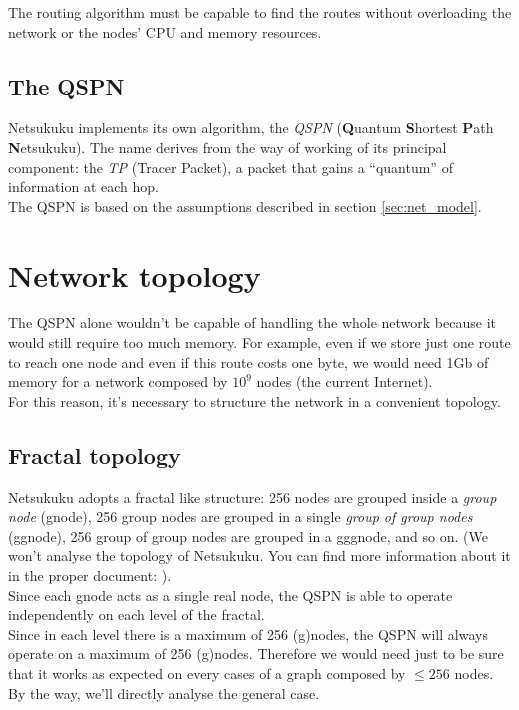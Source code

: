 \documentclass[a4paper]{article}
\begin{document}
The routing algorithm must be capable to find the routes without overloading
the network or the nodes' CPU and memory resources.

\subsection{The QSPN}

Netsukuku implements its own algorithm, the \emph{QSPN} (\textbf{Q}uantum
\textbf{S}hortest \textbf{P}ath \textbf{N}etsukuku). The name derives from the
way of working of its principal component: the \emph{TP} (Tracer Packet), a
packet that gains a ``quantum'' of information at each hop.\\

The QSPN is based on the assumptions described in section \ref{sec:net_model}.

\section{Network topology}
\label{sec:net_topology}

The QSPN alone wouldn't be capable of handling the whole network because it
would still require too much memory. For example, even if we store just one
route to reach one node and even if this route costs one byte, we would need
1Gb of memory for a network composed by $10^9$ nodes (the current Internet).\\

For this reason, it's necessary to structure the network in a convenient
topology.

\subsection{Fractal topology}
\label{sec:fractal_topology}
Netsukuku adopts a fractal like structure:
256 nodes are grouped inside a \emph{group node} (gnode), 256 group nodes are grouped
in a single \emph{group of group nodes} (ggnode), 256 group of group nodes are
grouped in a gggnode, and so on. (We won't analyse the topology of Netsukuku. You 
can find more information about it in the proper document: \cite{ntktopology}).\\

Since each gnode acts as a single real node, the QSPN is able to operate independently
on each level of the fractal.\\

Since in each level there is a maximum of 256 (g)nodes, the QSPN will
always operate on a maximum of 256 (g)nodes. Therefore we would need just to
be sure that it works as expected on every cases of a graph composed by $\le
256$ nodes. By the way, we'll directly analyse the general case.\\
\end{document}
